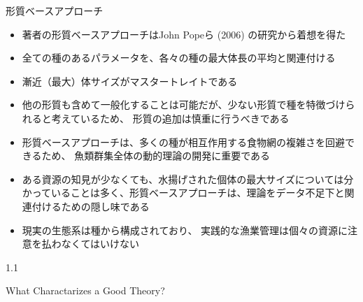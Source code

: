 \documentclass[
  ignorenonframetext,
]{beamer}
\providecommand{\tightlist}{%
  \setlength{\itemsep}{0pt}\setlength{\parskip}{0pt}}
\newcommand{\vspacesmall}{\vspace{3mm}}
\begin{document}
\begin{frame}{形質ベースアプローチ}
\protect\hypertarget{ux5f62ux8ceaux30d9ux30fcux30b9ux30a2ux30d7ux30edux30fcux30c1}{}

\begin{itemize}
\tightlist
\item
  著者の形質ベースアプローチはJohn Popeら (2006) の研究から着想を得た\\
  \vspacesmall
\item
  全ての種のあるパラメータを、各々の種の最大体長の平均と関連付ける
  \vspacesmall
\item
  漸近（最大）体サイズがマスタートレイトである \vspacesmall
\item
  他の形質も含めて一般化することは可能だが、少ない形質で種を特徴づけられると考えているため、
  形質の追加は慎重に行うべきである\\
  \vspacesmall
\item
  形質ベースアプローチは、多くの種が相互作用する食物網の複雑さを回避できるため、
  魚類群集全体の動的理論の開発に重要である\\
  \vspacesmall
\item
  ある資源の知見が少なくても、水揚げされた個体の最大サイズについては分かっていることは多く、形質ベースアプローチは、理論をデータ不足下と関連付けるための隠し味である\\
  \vspacesmall
\item
  現実の生態系は種から構成されており、
  実践的な漁業管理は個々の資源に注意を払わなくてはいけない
\end{itemize}

\end{frame}

\begin{frame}

\begin{LARGE} 
\begin{center}
\begin{bf}
1.1   
  
What Charactarizes a Good Theory?
\end{bf}
\end{center}
\end{LARGE}

\end{frame}
\end{document}
